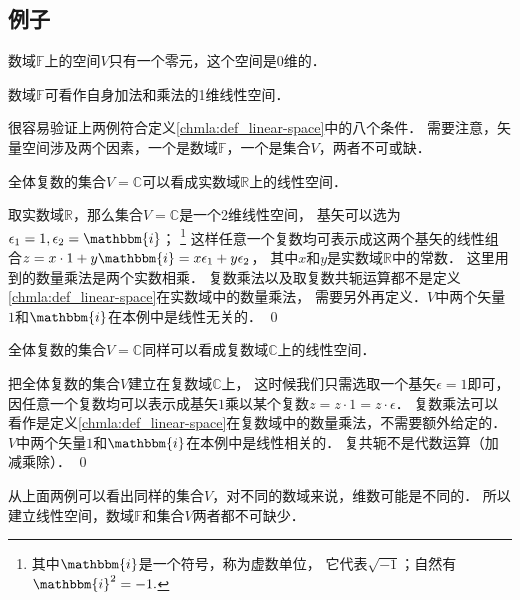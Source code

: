 \subsection{例子}
\begin{example}\label{chmla:exm_zero}
    数域$\mathbb{F}$上的空间$V$只有一个零元，这个空间是$0$维的．
\end{example}
\begin{example}\label{chmla:exm_vsF}
    数域$\mathbb{F}$可看作自身加法和乘法的1维线性空间．
\end{example}
很容易验证上两例符合定义\ref{chmla:def_linear-space}中的八个条件．
需要注意，矢量空间涉及两个因素，一个是数域$\mathbb{F}$，一个是集合$V$，两者不可或缺．
\begin{example}\label{chmla:exm_rc1}
    全体复数的集合$V=\mathbb{C}$可以看成实数域$\mathbb{R}$上的线性空间．
\end{example}
取实数域$\mathbb{R}$，那么集合$V=\mathbb{C}$是一个2维线性空间，
基矢可以选为$\epsilon_1=1,\epsilon_2=\mathbbm{i}$；
{\footnote{其中$\mathbbm{i}$是一个符号，称为虚数单位，
        它代表$\sqrt{-1}$；自然有$\mathbbm{i}^2=-1.$}}
这样任意一个复数均可表示成这两个基矢的线性组合$z=x\cdot 1+y\mathbbm{i}=x\epsilon_1+y\epsilon_2$，
其中$x$和$y$是实数域$\mathbb{R}$中的常数．
这里用到的数量乘法是两个实数相乘．
复数乘法以及取复数共轭运算都不是定义\ref{chmla:def_linear-space}在实数域中的数量乘法，
需要另外再定义．$V$中两个矢量$1$和$\mathbbm{i}$在本例中是线性无关的．
\qed

\begin{example}\label{chmla:exm_rc2}
    全体复数的集合$V=\mathbb{C}$同样可以看成复数域$\mathbb{C}$上的线性空间．
\end{example}
把全体复数的集合$V$建立在复数域$\mathbb{C}$上，
这时候我们只需选取一个基矢$\epsilon=1$即可，
因任意一个复数均可以表示成基矢$1$乘以某个复数$z=z\cdot 1=z\cdot \epsilon$．
复数乘法可以看作是定义\ref{chmla:def_linear-space}在复数域中的数量乘法，不需要额外给定的．
$V$中两个矢量$1$和$\mathbbm{i}$在本例中是线性相关的．
复共轭不是代数运算（加减乘除）．
\qed

从上面两例可以看出同样的集合$V$，对不同的数域来说，维数可能是不同的．
所以建立线性空间，数域$\mathbb{F}$和集合$V$两者都不可缺少．




